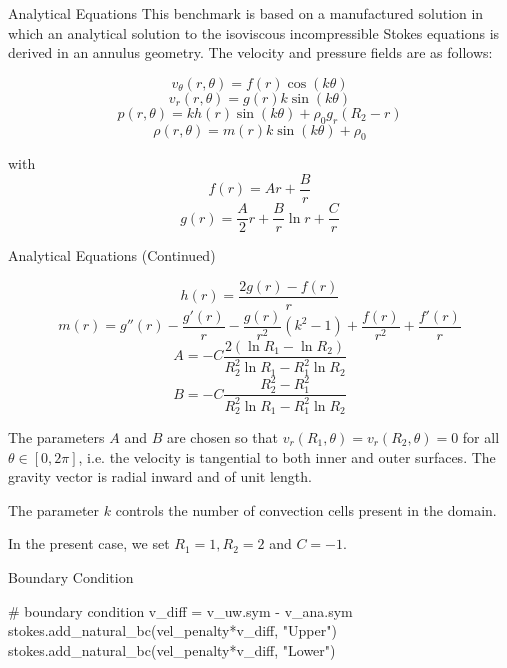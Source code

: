 \documentclass[10pt,aspectratio=169]{beamer}
\begin{document}
\begin{frame}{Analytical Equations}
	This benchmark is based on a manufactured solution in which an analytical solution to the isoviscous incompressible Stokes equations is derived in an annulus geometry. The velocity and pressure fields are as follows:
	
	$$ v_{\theta}(r, \theta) = f(r) \cos(k\theta) $$
	$$ v_r(r, \theta) = g(r)k \sin(k\theta) $$
	$$ p(r, \theta) = kh(r) \sin(k\theta) + \rho_0g_r(R_2 - r) $$
	$$ \rho(r, \theta) = m(r)k \sin(k\theta) + \rho_0 $$
	
	with
	$$ f(r) = Ar + \frac{B}{r} $$
	$$ g(r) = \frac{A}{2}r + \frac{B}{r}\ln r + \frac{C}{r} $$
	
\end{frame}

\begin{frame}{Analytical Equations (Continued)}
	
	$$ h(r) = \frac{2g(r) - f(r)}{r} $$
	$$ m(r) = g''(r) - \frac{g'(r)}{r} - \frac{g(r)}{r^2}(k^2 - 1) + \frac{f(r)}{r^2} + \frac{f'(r)}{r} $$
	$$ A = -C\frac{2(\ln R_1 - \ln R_2)}{R_2^2 \ln R_1 - R_1^2 \ln R_2} $$
	$$ B = -C\frac{R_2^2 - R_1^2}{R_2^2 \ln R_1 - R_1^2 \ln R_2} $$
	
	The parameters $A$ and $B$ are chosen so that $ v_r(R_1, \theta) = v_r(R_2, \theta) = 0 $ for all $\theta \in [0, 2\pi]$, i.e. the velocity is tangential to both inner and outer surfaces. The gravity vector is radial inward and of unit length.
	
	The parameter $k$ controls the number of convection cells present in the domain.
	
	In the present case, we set $ R_1 = 1, R_2 = 2$ and $C = -1 $.
\end{frame}

\begin{frame}[fragile]{Boundary Condition}
	\begin{python}
		# boundary condition
		v_diff =  v_uw.sym - v_ana.sym
		stokes.add_natural_bc(vel_penalty*v_diff, "Upper")
		stokes.add_natural_bc(vel_penalty*v_diff, "Lower")
	\end{python}
\end{frame}
\end{document}
